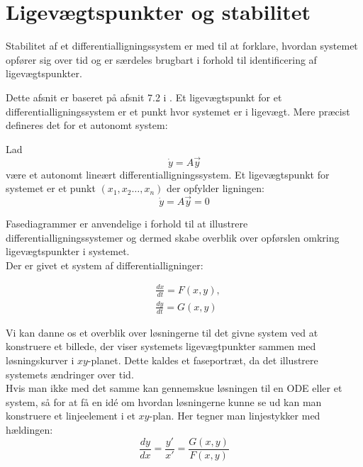 \section{Ligevægtspunkter og stabilitet}
Stabilitet af et differentialligningssystem er med til at forklare, hvordan systemet opfører sig over tid og er særdeles brugbart i forhold til identificering af ligevægtspunkter. 
\hfill \break

Dette afsnit er baseret på afsnit 7.2 i \citep{EP}. \hfill \break
Et ligevægtspunkt for et differentialligningssystem er et punkt hvor systemet er i ligevægt. Mere præcist defineres det for et autonomt system:
\begin{definition}[Ligevægtspunkt]
Lad 
$$\dot{y} = A\vec{y}$$
være et autonomt lineært differentialligningssystem.
Et ligevægtspunkt for systemet er et punkt $(x_1,x_2 \hdots ,x_n)$ der opfylder ligningen:
$$\dot{y} = A\vec{y}=0$$
\end{definition}

Fasediagrammer er anvendelige i forhold til at illustrere differentialligningssystemer og dermed skabe overblik over opførslen omkring ligevægtspunkter i systemet.\\

Der er givet et system af differentialligninger:

\begin{equation}
    \begin{aligned}
    &\frac{dx}{dt}=F(x,y),\\ 
    &\frac{dy}{dt}=G(x,y)
    \end{aligned}
\end{equation}

Vi kan danne os et overblik over løsningerne til det givne system ved at konstruere et billede, der viser systemets ligevægtpunkter sammen med løsningskurver i $xy$-planet. Dette kaldes et faseportræt, da det illustrere systemets ændringer over tid. \\
\hfill \break
Hvis man ikke med det samme kan gennemskue løsningen til en ODE eller et system, så for at få en idé om hvordan løsningerne kunne se ud kan man konstruere et linjeelement i et $xy$-plan. Her tegner man linjestykker med hældingen:    
$$\frac{dy}{dx}=\frac{y'}{x'}=\frac{G(x,y)}{F(x,y)}$$

